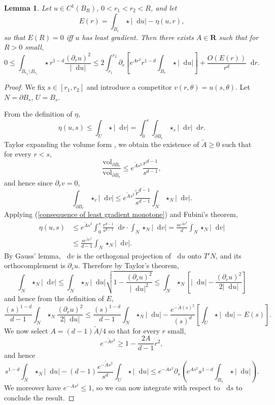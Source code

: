 \documentclass[reqno,12pt,letterpaper]{amsart}
\newcommand{\RR}{\mathbf{R}}
\newcommand*\dif{\mathop{}\!\mathrm{d}}
\newcommand{\vol}{\mathrm{vol}}
\newtheorem{lemma}[theorem]{Lemma}
\theoremstyle{definition}
\numberwithin{equation}{section}
\begin{document}
\begin{lemma}\label{monotonicity lemma}
Let $u \in C^1(B_R)$, $0 < r_1 < r_2 < R$, and let
$$E(r) = \int_{B_r} \star |\dif u| - \eta(u, r),$$
so that $E(R) = 0$ iff $u$ has least gradient. Then there exists $A \in \RR$ such that for $R > 0$ small,
\begin{equation}\label{monotonicity lemma eqn}
0 \leq \int_{B_{r_2} \setminus B_{r_1}} \star r^{1 - d}\frac{(\partial_ru)^2}{|\dif u|} \leq 2\int_{r_1}^{r_2} \partial_r \left[e^{Ar^2} r^{1-d}\int_{B_r} \star |\dif u|\right] + \frac{O(E(r))}{r^d} \dif r.
\end{equation}
\end{lemma}
\begin{proof}
We fix $s \in [r_1, r_2]$ and introduce a competitor $v(r, \theta) = u(s, \theta)$.
Let $N = \partial B_{s}$, $U = B_{s}$.

From the definition of $\eta$,
\begin{equation}\label{consequence of least gradient monotone}
    \eta(u, s) \leq \int_U \star |\dif v| = \int_0^s \int_{\partial B_r} \star_r |\dif v| \dif r.
\end{equation}
Taylor expanding the volume form \cite[Lemma 3.4]{schoen1994lectures}, we obtain the existence of $\tilde A \geq 0$ such that for every $r < s$,
$$\frac{\vol_{\partial B_r}}{\vol_{\partial B_s}} \leq e^{\tilde A s^2} \frac{r^{d - 1}}{s^{d - 1}},$$
and hence since $\partial_r v = 0$,
$$\int_{\partial B_r} \star_r |\dif v| \leq e^{\tilde As^2} \frac{\tilde r^{d - 1}}{s^{d - 1}} \int_N \star_N |\dif v|.$$
Applying (\ref{consequence of least gradient monotone}) and Fubini's theorem,
\begin{align*}
\eta(u, s) &\leq  e^{\tilde As^2} \int_0^{s} \frac{r^{d - 1}}{s^{d - 1}} \dif r \cdot \int_N \star_N |\dif v| = \frac{s e^{\tilde As^2}}{d} \int_N \star_N |\dif v|\\
&\leq \frac{s e^{\tilde As^2}}{d - 1} \int_N \star_N |\dif v|.
\end{align*}
By Gauss' lemma, $\dif v$ is the orthogonal projection of $\dif u$ onto $T'N$, and its orthocomplement is $\partial_r u$. Therefore by Taylor's theorem,
$$\int_N \star_N |\dif v| \leq \int_N \star_N |\dif u| \sqrt{1 - \frac{(\partial_r u)^2}{|\dif u|^2}} \leq \int_N \star_N \left[|\dif u| - \frac{(\partial_r u)^2}{2 |\dif u|}\right]$$
and hence from the definition of $E$,
$$\frac{(s)^{1 - d}}{d - 1} \int_N \star_N \frac{(\partial_r u)^2}{2|\dif u|} \leq \frac{(s)^{1 - d}}{d - 1} \int_N \star_N |\dif u| - \frac{e^{-\tilde A(s)^2}}{(s)^d}\left[\int_U \star|\dif u| - E(s)\right].$$
We now select $A = (d - 1)\tilde A/4$ so that for every $r$ small,
$$e^{-\tilde Ar^2} \geq 1 - \frac{2A}{d - 1}r^2,$$
and hence
$$s^{1 - d} \int_N \star_N |\dif u| - (d - 1)\frac{e^{-\tilde As^2}}{s^d} \int_U \star|\dif u| \leq e^{-As^2} \partial_s\left(e^{As^2} s^{1 - d} \int_{B_s} \star|\dif u|\right).$$
We moreover have $e^{-As^2} \leq 1$, so we can now integrate with respect to $\dif s$ to conclude the result.
\end{proof}
\end{document}
